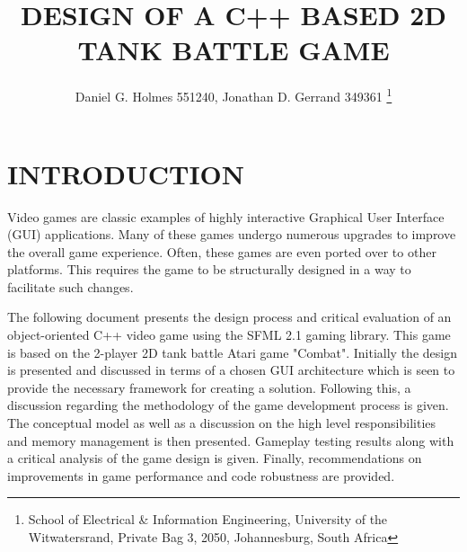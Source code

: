 \documentclass[10pt,twocolumn]{witseiepaper}
\begin{document}
\title{DESIGN OF A C++ BASED 2D TANK BATTLE GAME}

\author{Daniel G. Holmes 551240, Jonathan D. Gerrand 349361
\thanks{School of Electrical \& Information Engineering, University of the
Witwatersrand, Private Bag 3, 2050, Johannesburg, South Africa}
}

% 



\maketitle
\thispagestyle{empty}\pagestyle{empty}


%
\section{INTRODUCTION}%
Video games are classic examples of highly interactive Graphical User Interface (GUI) applications. Many of these games undergo numerous upgrades to improve the overall game experience. Often, these games are even ported over to other platforms. This requires the game to be structurally designed in a way to facilitate such changes. 

The following document presents the design process and critical evaluation of an object-oriented C++ video game using the SFML 2.1 gaming library. This game is based on the 2-player 2D tank battle Atari game "Combat". Initially the design is presented and discussed in terms of a chosen GUI architecture which is seen to provide the necessary framework for creating a solution. Following this, a discussion regarding the methodology of the game development process is given. The conceptual model as well as a discussion on the high level responsibilities and memory management is then presented. Gameplay testing results along with a critical analysis of the game design is given. Finally, recommendations on improvements in game performance and code robustness are provided.
\end{document}
